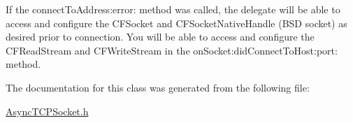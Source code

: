 If the connectToAddress:error: method was called, the delegate will be able to access and configure the CFSocket and CFSocketNativeHandle (BSD socket) as desired prior to connection. You will be able to access and configure the CFReadStream and CFWriteStream in the onSocket:didConnectToHost:port: method. 

The documentation for this class was generated from the following file:\begin{DoxyCompactItemize}
\item 
\hyperlink{_async_t_c_p_socket_8h}{AsyncTCPSocket.h}\end{DoxyCompactItemize}
